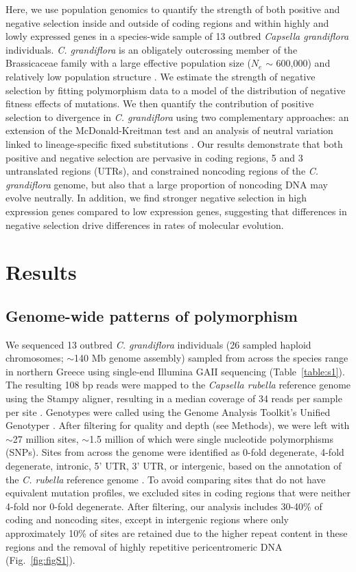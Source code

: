 Here, we use population genomics to quantify the strength of both positive and negative selection inside and outside of coding regions and within highly and lowly expressed genes in a species-wide sample of 13 outbred \textit{Capsella grandiflora} individuals. \textit{C. grandiflora} is an obligately outcrossing member of the Brassicaceae family with a large effective population size ($N_{e}$ $\sim$ 600,000) and relatively low population structure \citep{gossmann2010,St_onge2011-jz}. We estimate the strength of negative selection by fitting polymorphism data to a model of the distribution of negative fitness effects of mutations. We then quantify the contribution of positive selection to divergence in \textit{C. grandiflora} using two complementary approaches: an extension of the McDonald-Kreitman test \citep{Eyre-Walker2009-zt} and an analysis of neutral variation linked to lineage-specific fixed substitutions \citep{sella2009}. Our results demonstrate that both positive and negative selection are pervasive in coding regions, 5\textsc{} and 3\textsc{} untranslated regions (UTRs), and constrained noncoding regions of the \textit{C. grandiflora} genome, but also that a large proportion of noncoding DNA may evolve neutrally. In addition, we find stronger negative selection in high expression genes compared to low expression genes, suggesting that differences in negative selection drive differences in rates of molecular evolution.

\section{Results}
\subsection{Genome-wide patterns of polymorphism}

We sequenced 13 outbred \textit{C. grandiflora} individuals (26 sampled haploid chromosomes; $\sim$140 Mb genome assembly) sampled from across the species\textsc{} range in northern Greece using single-end Illumina GAII sequencing (Table~\ref{table:s1}). The resulting 108 bp reads were mapped to the \textit{Capsella rubella} reference genome \citep{Slotte2013-py} using the Stampy aligner, resulting in a median coverage of 34 reads per sample per site \citep{Lunter2011-uc}. Genotypes were called using the Genome Analysis Toolkit’s Unified Genotyper \citep{gatk}. After filtering for quality and depth (see Methods), we were left with $\sim$27 million sites, $\sim$1.5 million of which were single nucleotide polymorphisms (SNPs). Sites from across the genome were identified as 0-fold degenerate, 4-fold degenerate, intronic, 5’ UTR, 3’ UTR, or intergenic, based on the annotation of the \textit{C. rubella} reference genome \citep{Slotte2013-py}. To avoid comparing sites that do not have equivalent mutation profiles, we excluded sites in coding regions that were neither 4-fold nor 0-fold degenerate. After filtering, our analysis includes 30-40\% of coding and noncoding sites, except in intergenic regions where only approximately 10\% of sites are retained due to the higher repeat content in these regions and the removal of highly repetitive pericentromeric DNA (Fig.~\ref{fig:figS1}). 

